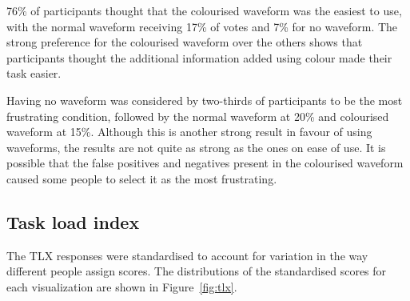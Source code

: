 
76\% of participants thought that the colourised waveform was the easiest to use, with the normal waveform receiving
17\% of votes and 7\% for no waveform.  The strong preference for the colourised waveform over the others shows that
participants thought the additional information added using colour made their task easier.

Having no waveform was considered by two-thirds of participants to be the most frustrating condition, followed by the
normal waveform at 20\% and colourised waveform at 15\%. Although this is another strong result in favour of using
waveforms, the results are not quite as strong as the ones on ease of use. It is possible that the false positives and
negatives present in the colourised waveform caused some people to select it as the most frustrating.

\subsection{Task load index}
The TLX responses were standardised to account for variation in the way different people assign scores. The
distributions of the standardised scores for each visualization are shown in Figure~\ref{fig:tlx}.

